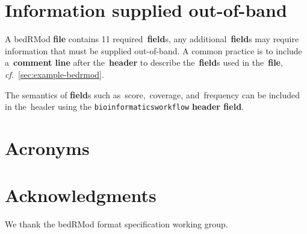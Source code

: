 \documentclass[11pt]{article}
\begin{document}
\section{Information supplied out-of-band}

A \ac{bedRMod} \textbf{file} contains 11 required~\textbf{field}s, any additional~\textbf{field}s may require information that must be supplied out-of-band.
A common practice is to include a~\textbf{comment line} after the~\textbf{header} to describe the~\textbf{field}s used in the~\textbf{file}, \textit{cf.}~\autoref{sec:example-bedrmod}.

The semantics of \textbf{field}s such as~\textsf{score},~\textsf{coverage}, and~\textsf{frequency} can be included in the~\textsf{header} using the
\texttt{bioinformatics\textunderscore workflow} \textbf{header field}.

\section{Acronyms}

\begin{acronym}
\end{acronym}

\section{Acknowledgments}

We thank the \acf{bedRMod} format specification working group.
\end{document}

